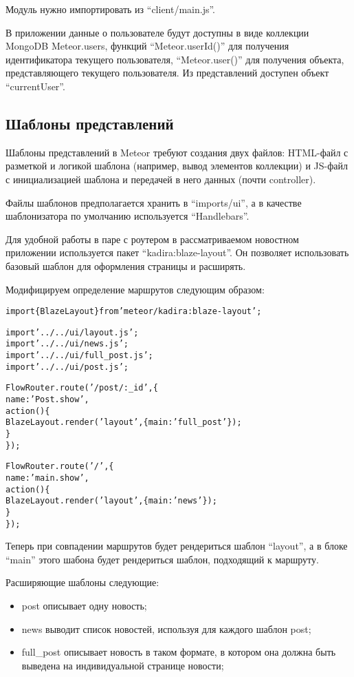 \documentclass[a4paper,12pt]{article}
\begin{document}
Модуль нужно импортировать из ``client/main.js''.

В приложении данные о пользователе будут доступны
в виде коллекции MongoDB Meteor.users, функций
``Meteor.userId()'' для получения идентификатора
текущего пользователя, ``Meteor.user()'' для
получения объекта, представляющего текущего пользователя.
Из представлений доступен объект ``currentUser''. 

\subsection{Шаблоны представлений}
Шаблоны представлений в Meteor требуют создания
двух файлов: HTML-файл с разметкой и логикой
шаблона (например, вывод элементов коллекции) и 
JS-файл с инициализацией шаблона и передачей
в него данных (почти controller).

Файлы шаблонов предполагается хранить в ``imports/ui'',
а в качестве шаблонизатора по умолчанию используется
``Handlebars''.

Для удобной работы в паре с роутером в рассматриваемом
новостном приложении используется пакет
``kadira:blaze-layout''. Он позволяет использовать
базовый шаблон для оформления страницы и расширять.

Модифицируем определение маршрутов следующим образом:

\begin{alltt}
import \{ BlazeLayout \} from 'meteor/kadira:blaze-layout';	
	
import '../../ui/layout.js';
import '../../ui/news.js';
import '../../ui/full\_post.js';
import '../../ui/post.js';	
	
FlowRouter.route('/post/:\_id', \{
    name: 'Post.show',
    action() \{  
        BlazeLayout.render('layout', \{ main: 'full\_post' \});
    \}
\});

FlowRouter.route('/', \{
    name: 'main.show',
    action() \{  
	    BlazeLayout.render('layout', \{ main: 'news' \});
    \}
\});
\end{alltt}

Теперь при совпадении маршрутов будет рендериться шаблон
``layout'', а в блоке ``main'' этого шабона будет 
рендериться шаблон, подходящий к маршруту.

Расширяющие шаблоны следующие: 
\begin{itemize}
	\item post описывает одну новость;
	\item news выводит список новостей, используя для каждого шаблон post;
	\item full\_post описывает новость в таком формате, в котором она должна быть
	выведена на индивидуальной странице новости;
\end{itemize}
\end{document}
